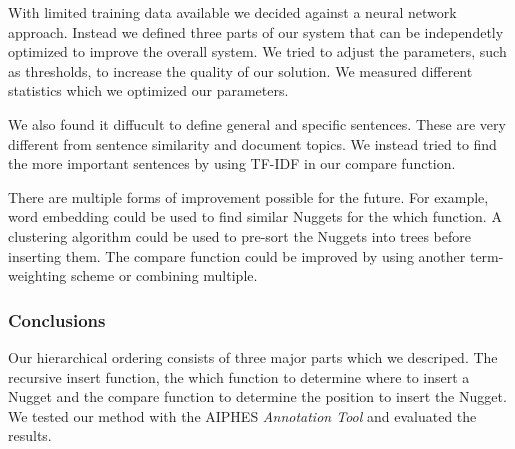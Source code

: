 With limited training data available we decided against a neural network approach. Instead we defined three parts of our system that can be independetly optimized to improve the overall system. We tried to adjust the parameters, such as thresholds, to increase the quality of our solution. We measured different statistics which we optimized our parameters.

We also found it diffucult to define general and specific sentences. These are very different from sentence similarity and document topics. We instead tried to find the more important sentences by using TF-IDF in our compare function.

There are multiple forms of improvement possible for the future. For example, word embedding could be used to find similar Nuggets for the which function. A clustering algorithm could be used to pre-sort the Nuggets into trees before inserting them. The compare function could be improved by using another term-weighting scheme or combining multiple.

\subsubsection{Conclusions}

Our hierarchical ordering consists of three major parts which we descriped. The recursive insert function, the which function to determine where to insert a Nugget and the compare function to determine the position to insert the Nugget. We tested our method with the AIPHES \textit{Annotation Tool} and evaluated the results.